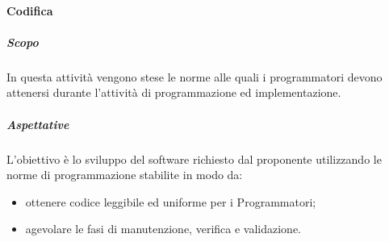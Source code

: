 			\paragraph{Codifica}
				\subparagraph{Scopo}	
					In questa attività vengono stese le norme alle quali i programmatori devono attenersi durante l’attività di programmazione ed implementazione.
				\subparagraph{Aspettative}
					 L’obiettivo è lo sviluppo del software richiesto dal proponente utilizzando le norme di programmazione stabilite in modo da:
					 	\begin{itemize}
					 	\item ottenere codice leggibile ed uniforme per i Programmatori;
					 	\item agevolare le fasi di manutenzione, verifica e validazione.
					 \end{itemize} 
%					
%				 
